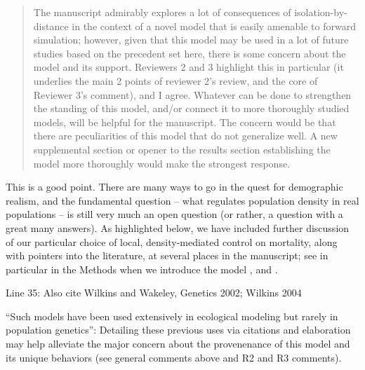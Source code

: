 \begin{quote}
    The manuscript admirably explores a lot of consequences of
    isolation-by-distance in the context of a novel model that is easily amenable
    to forward simulation; however, given that this model may be used in a lot of
    future studies based on the precedent set here, there is some concern about the
    model and its support. Reviewers 2 and 3 highlight this in particular (it
    underlies the main 2 points of reviewer 2's review, and the core of Reviewer
    3's comment), and I agree. Whatever can be done to strengthen the standing of
    this model, and/or connect it to more thoroughly studied models, will be
    helpful for the manuscript. The concern would be that there are peculiarities
    of this model that do not generalize well. A new supplemental section or opener
    to the results section establishing the model more thoroughly would make the
    strongest response.
\end{quote}


This is a good point. There are many ways to go in the quest for demographic realism,
and the fundamental question -- what regulates population density in real populations --
is still very much an open question (or rather, a question with a great many answers).
As highlighted below,
we have included further discussion of our particular choice
of local, density-mediated control on mortality,
along with pointers into the literature, at several places in the manuscript;
see in particular in the Methods when we introduce the model ,
and .

\begin{point}{Line 35:}
    Also cite Wilkins and Wakeley, Genetics 2002; Wilkins 2004
\end{point}


\begin{point}{\revref}
    ``Such models have been used extensively in ecological modeling but rarely in population genetics'': Detailing these previous uses via citations and elaboration may help alleviate the major concern about the provenenance of this model and its unique behaviors (see general comments above and R2 and R3 comments).
\end{point}


